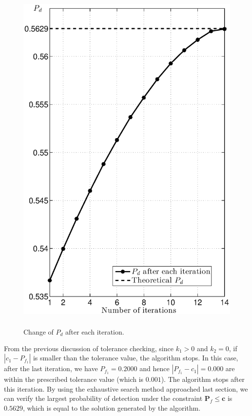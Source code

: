 \begin{figure}[H]
\centering
\includegraphics[width = 12cm , height = 18cm ]{2/24pd.eps}
\caption{Change of $P_d$ after each iteration.}
\label{fig: 2.5}
\end{figure}
\newpage

From the previous discussion of tolerance checking, since $k_1 > 0$ and $k_2 = 0$, if $ |c_1 - P_{f_1}| $ is smaller than the tolerance value, the algorithm stops. In this case, after the last iteration, we have $P_{f_1} = 0.2000$ and hence  $|P_{f_1} - c_1| = 0.000$ are within the prescribed tolerance value (which is $0.001$).  The algorithm stops after this iteration.   By using the exhaustive search method approached last section, we can verify the largest probability of detection under the constraint $\mathbf{P}_f \leq \mathbf{c}$ is $0.5629$, which is equal to the solution generated by the algorithm.
